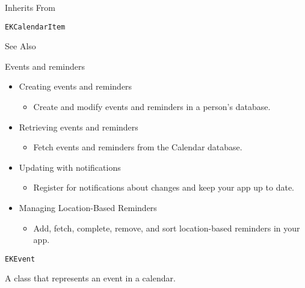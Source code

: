 \documentclass{article}
\begin{document}
Inherits From

\texttt{EKCalendarItem}

See Also

Events and reminders

\begin{itemize}
    \item Creating events and reminders
    \begin{itemize}
        \item Create and modify events and reminders in a person's database.
    \end{itemize}
    \item Retrieving events and reminders
    \begin{itemize}
        \item Fetch events and reminders from the Calendar database.
    \end{itemize}
    \item Updating with notifications
    \begin{itemize}
        \item Register for notifications about changes and keep your app up to date.
    \end{itemize}
    \item Managing Location-Based Reminders
    \begin{itemize}
        \item Add, fetch, complete, remove, and sort location-based reminders in your app.
    \end{itemize}
\end{itemize}

\texttt{EKEvent}

A class that represents an event in a calendar.

\newpage
\end{document}
